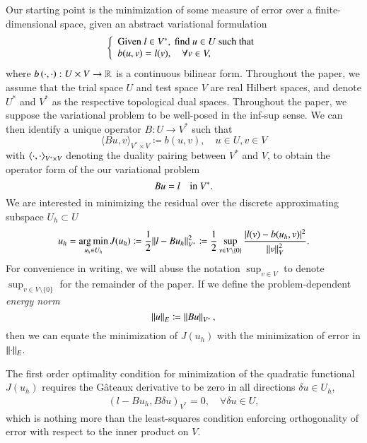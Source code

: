 Our starting point is the minimization of some measure of error over a finite-dimensional space, given an abstract variational formulation 
\begin{equation}
\eqnlab{variationEq}
\left\{
  \begin{array}{l}
    \text{Given } l \in V^*, \text{ find } u \in U  \text{ such that} \\ 
    b(u,v) = l(v), \quad \forall v\in V,
  \end{array}
  \right.
\end{equation}
where $b\LRp{\cdot,\cdot}: U \times V \to \mbb{R}$ is a continuous bilinear form.  Throughout the paper, we assume that the trial space $U$ and test space $V$ are real Hilbert spaces, and denote $U^*$ and $V^*$ as the respective topological dual spaces.  Throughout the paper, we suppose the variational problem  to be well-posed in the inf-sup sense. We can then identify a unique operator $B:U\rightarrow V^*$ such that 
\[
\langle Bu,v\rangle_{V^* \times V} \coloneqq b(u,v), \quad u\in U, v\in V
\]
with $\LRa{\cdot, \cdot}_{V^*\times V}$ denoting the duality pairing between $V^*$ and $V$, to obtain the operator form of the our variational problem
\begin{equation}
\eqnlab{dualEq}
Bu = l \quad \text{in } V^*.
\end{equation}
We are interested in minimizing the residual over the discrete approximating subspace $U_h \subset U$
\[
u_h = \underset{u_h\in U_h}{\arg\min}\, J(u_h) \coloneqq \frac{1}{2}\|l-Bu_h\|_{V^*}^2 \coloneqq\frac{1}{2} \sup_{v\in V\setminus\{0\}} \frac{| l(v)- b(u_h,v)|^2}{\nor{v}_V^2}.
\]
For convenience in writing, we will abuse the notation $\sup_{v \in V}$ to denote $\sup_{v\in V\setminus\{0\}}$ for the remainder of the paper.  If we define the problem-dependent \textit{energy norm} 
\[
\nor{u}_E \coloneqq \nor{Bu}_{V^*},
\]
then we can equate the minimization of $J(u_h)$ with the minimization of error in $\nor{\cdot}_E$. 

The first order optimality condition for minimization of the quadratic functional $J(u_h)$ requires the G\^ateaux derivative to be zero in all directions $\delta u \in U_h$,
\begin{align}
\left(l-Bu_h,B\delta u\right)_{V^*} = 0, \quad \forall \delta u \in U,
\label{orthog}
\end{align}
which is nothing more than the least-squares condition enforcing orthogonality of error with respect to the inner product on $V$.  

